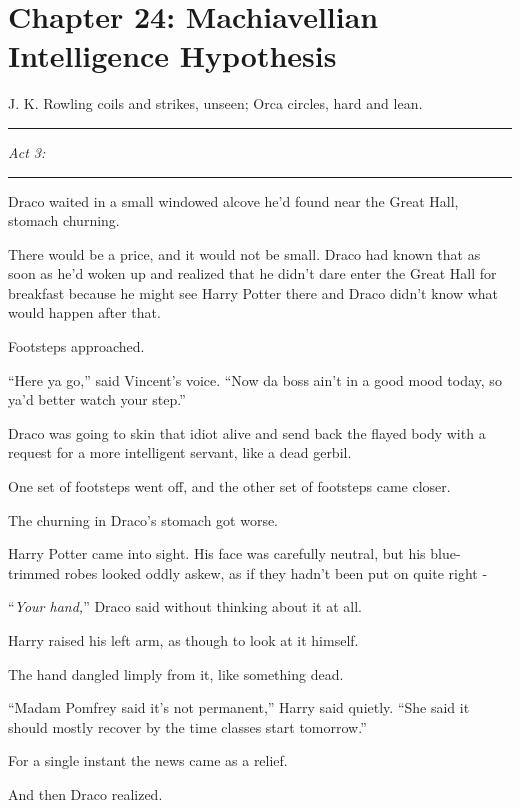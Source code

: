 \chapter{Chapter 24: Machiavellian Intelligence Hypothesis}
J. K. Rowling coils and strikes, unseen; Orca circles, hard and lean.

\begin{center}\rule{3in}{0.4pt}\end{center}

\emph{Act 3:}

\begin{center}\rule{3in}{0.4pt}\end{center}

Draco waited in a small windowed alcove he'd found near the Great Hall, stomach churning.

There would be a price, and it would not be small. Draco had known that as soon as he'd woken up and realized that he didn't dare enter the Great Hall for breakfast because he might see Harry Potter there and Draco didn't know what would happen after that.

Footsteps approached.

``Here ya go,'' said Vincent's voice. ``Now da boss ain't in a good mood today, so ya'd better watch your step.''

Draco was going to skin that idiot alive and send back the flayed body with a request for a more intelligent servant, like a dead gerbil.

One set of footsteps went off, and the other set of footsteps came closer.

The churning in Draco's stomach got worse.

Harry Potter came into sight. His face was carefully neutral, but his blue-trimmed robes looked oddly askew, as if they hadn't been put on quite right -

``\emph{Your hand,}'' Draco said without thinking about it at all.

Harry raised his left arm, as though to look at it himself.

The hand dangled limply from it, like something dead.

``Madam Pomfrey said it's not permanent,'' Harry said quietly. ``She said it should mostly recover by the time classes start tomorrow.''

For a single instant the news came as a relief.

And then Draco realized.

